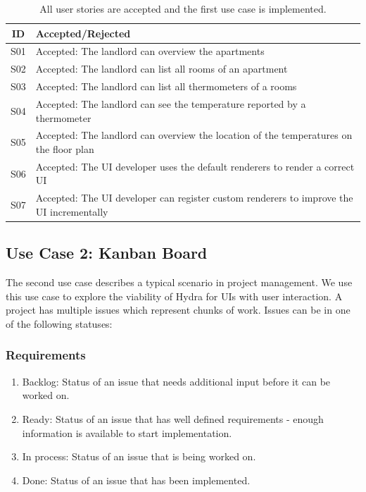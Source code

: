 \begin{table}
  \begin{center}
    \begin{tabular}{ |c|l| }
      \hline
      ID & Accepted/Rejected \\
      \hline
      S01 & Accepted: The landlord can overview the apartments \\
      S02 & Accepted: The landlord can list all rooms of an apartment \\
      S03 & Accepted: The landlord can list all thermometers of a rooms \\
      S04 & Accepted: The landlord can see the temperature reported by a thermometer \\
      S05 & Accepted: The landlord can overview the location of the temperatures on the floor plan \\
      S06 & Accepted: The UI developer uses the default renderers to render a correct UI \\
      S07 & Accepted: The UI developer can register custom renderers to improve the UI incrementally \\
      \hline
    \end{tabular}
    \caption{All user stories are accepted and the first use case is implemented.}
  \end{center}
\end{table}

\subsection{Use Case 2: Kanban Board}
The second use case describes a typical scenario in project management. We use this use case to explore the viability of Hydra for UIs with user interaction. A project has multiple issues which represent chunks of work. Issues can be in one of the following statuses:

\subsubsection{Requirements}

\begin{enumerate}
  \item Backlog: Status of an issue that needs additional input before it can be worked on.
  \item Ready: Status of an issue that has well defined requirements - enough information is available to start implementation.
  \item In process: Status of an issue that is being worked on.
  \item Done: Status of an issue that has been implemented.
\end{enumerate}

